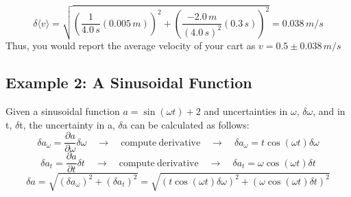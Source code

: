 \[ \delta \langle v \rangle = \sqrt{ \left( \frac{1}{4.0 \, s} (0.005 \, m) \right)^{2} + \left( \frac{-2.0 \, m}{(4.0 \, s)^{2}} (0.3 \, s) \right)^{2}} = 0.038 \, m/s \]
Thus, you would report the average velocity of your cart as $v = 0.5 \pm 0.038 \, m/s$

\subsection*{Example 2: A Sinusoidal Function}
Given a sinusoidal function $a = \sin(\omega t) + 2$ and uncertainties in $\omega$, $\delta \omega$, and in t, $\delta$t, the uncertainty in a, $\delta$a can be calculated as follows:
 \[ \delta a_{\omega} = \frac{\partial a}{\partial \omega} \delta \omega
   \quad \rightarrow \quad \mathrm{compute \ derivative} \quad \rightarrow \quad
   \delta a_{\omega} = t \cos(\omega t) \delta \omega \]
%
\[ \delta a_{t} = \frac{\partial a}{\partial t} \delta t
   \quad \rightarrow \quad \mathrm{compute \ derivative} \quad \rightarrow \quad
   \delta a_{t} = \omega \cos(\omega t) \delta t \]
%
\[ \delta a = \sqrt{(\delta a_{\omega})^{2} + (\delta a_{t})^{2}} 
   = \sqrt{\left( t \cos(\omega t) \delta \omega \right)^{2} + \left( \omega \cos(\omega t) \delta t \right)^{2}} \]
   
